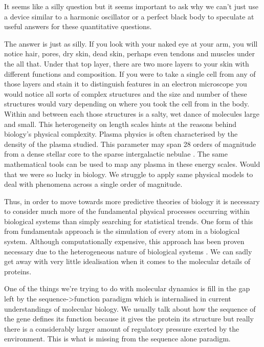 It seems like a silly question but it seems important to ask why we can't just use a device similar to a harmonic oscillator or a perfect black body to speculate at useful answers for these quantitative questions. 

The answer is just as silly. If you look with your naked eye at your arm, you will notice hair, pores, dry skin, dead skin, perhaps even tendons and muscles under the all that. Under that top layer, there are two more layers to your skin with different functions and composition. If you were to take a single cell from any of those layers and stain it to distinguish features in an electron microscope you would notice all sorts of complex structures and the size and number of these structures would vary depending on where you took the cell from in the body. Within and between each those structures is a salty, wet dance of molecules large and small. This heterogeneity on length scales hints at the reasons behind biology's physical complexity. Plasma physics is often characterised by the density of the plasma studied. This parameter may span 28 orders of magnitude from a dense stellar core to the sparse intergalactic nebulae \cite{chen2018}. The same mathematical tools can be used to map any plasma in these energy scales. Would that we were so lucky in biology. We struggle to apply same physical models to deal with phenomena across a single order of magnitude.  

Thus, in order to move towards more predictive theories of biology it is necessary to consider much more of the fundamental physical processes occurring within biological systems than simply searching for statistical trends. One form of this from fundamentals approach is the simulation of every atom in a biological system. Although computationally expensive, this approach has been proven necessary due to the heterogeneous nature of biological systems \cite{moy2000, corry2000a}. We can sadly get away with very little idealisation when it comes to the molecular details of proteins.

One of the things we're trying to do with molecular dynamics is fill in the gap left by the sequence->function paradigm which is internalised in current understandings of molecular biology. We usually talk about how the sequence of the gene defines its function because it gives the protein its structure but really there is a considerably larger amount of regulatory pressure exerted by the environment. This is what is missing from the sequence alone paradigm.

